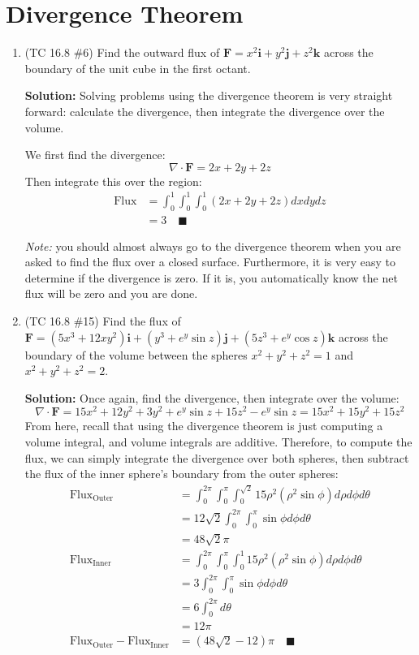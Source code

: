 \documentclass[letterpaper, 11pt]{article}
\begin{document}
\section{Divergence Theorem}
\begin{enumerate}
\item (TC 16.8 \#6) Find the outward flux of $\bm{F} = x^2 \bm{i} + y^2 \bm{j} + z^2 \bm{k}$ across the boundary of the unit cube in the first octant. 

\par \textbf{Solution:} Solving problems using the divergence theorem is very straight forward: calculate the divergence, then integrate the divergence over the volume. 
\par We first find the divergence:
\[ \nabla \cdot \bm{F} = 2x + 2y + 2z \]
Then integrate this over the region:
\begin{align*}
\text{Flux} &= \int_0^1 \int_0^1 \int_0^1 (2x + 2y + 2z) dxdydz \\
&= 3 \quad\blacksquare 
\end{align*}


\textit{Note:} you should almost always go to the divergence theorem when you are asked to find the flux over a closed surface. Furthermore, it is very easy to determine if the divergence is zero. If it is, you automatically know the net flux will be zero and you are done. 

\item (TC 16.8 \#15) Find the flux of $\bm{F} = (5x^3 + 12xy^2)\bm{i} + (y^3+ e^y\sin z)\bm{j} + (5z^3 + e^y \cos z)\bm{k}$ across the boundary of the volume between the spheres $x^2 + y^2 + z^2 =1 $ and $x^2 + y^2 + z^2 = 2$.

\par \textbf{Solution:} Once again, find the divergence, then integrate over the volume:
\[ \nabla \cdot \bm{F} = 15 x^2 + 12 y^2 + 3y^2 + e^y\sin z + 15z^2  - e^y \sin z = 15x^2 + 15y^2 + 15z^2 \]
From here, recall that using the divergence theorem is just computing a volume integral, and volume integrals are additive. Therefore, to compute the flux, we can simply integrate the divergence over both spheres, then subtract the flux of the inner sphere's boundary from the outer spheres:
\begin{align*} 
\text{Flux}_{\text{Outer}} &= \int_0^{2 \pi} \int_0^\pi \int_0^{\sqrt{2}} 15 \rho^2 (\rho^2 \sin \phi) d\rho d\phi d\theta \\
&= 12 \sqrt{2} \int_0^{2\pi} \int_0^\pi \sin \phi d\phi d\theta \\
&= 48 \sqrt{2} \pi \\
\text{Flux}_{\text{Inner}} &=  \int_0^{2 \pi} \int_0^\pi \int_0^{1} 15 \rho^2 (\rho^2 \sin \phi) d\rho d\phi d\theta \\
&= 3 \int_0^{2\pi} \int_0^\pi \sin \phi d\phi d\theta \\
&= 6 \int_0^{2\pi} d\theta \\
&= 12 \pi \\
\text{Flux}_{\text{Outer}} - \text{Flux}_{\text{Inner}} &= (48\sqrt{2} - 12) \pi \quad\blacksquare
\end{align*}

\end{enumerate}
\end{document}
